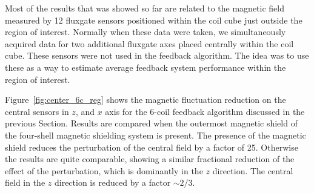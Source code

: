 Most of the results that was showed so far are related to the magnetic field
measured by 12 fluxgate sensors positioned within the coil cube just
outside the region of interest.  Normally when these data were taken,
we simultaneously acquired data for two additional fluxgate axes placed
centrally within the coil cube.  These sensors were not used in the
feedback algorithm.  The idea was to use these as a way to estimate
average feedback system performance within the region of interest.


Figure~\ref{fig:center_6c_reg} shows the magnetic fluctuation
reduction on the central sensors in $z$, and $x$ axis for the 6-coil
feedback algorithm discussed in the previous Section.  Results are
compared when the outermost magnetic shield of the four-shell magnetic
shielding system is present.  The presence of the magnetic shield
reduces the perturbation of the central field by a factor of 25.
Otherwise the results are quite comparable, showing a similar
fractional reduction of the effect of the perturbation, which is
dominantly in the $z$ direction.  The central field in the $z$
direction is reduced by a factor $\sim 2/3$.





